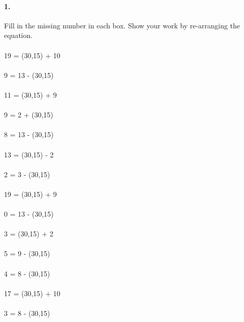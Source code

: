 \documentclass[12pt]{article}
\begin{document}
\paragraph{1.}
Fill in the missing number in each box. Show your work by re-arranging the equation. \\
\\
19 = \framebox(30,15){} + 10
\\
\\
9 = 13 - \framebox(30,15){}
\\
\\
11 = \framebox(30,15){} + 9
\\
\\
9 = 2 + \framebox(30,15){}
\\
\\
8 = 13 - \framebox(30,15){}
\\
\\
13 = \framebox(30,15){} - 2
\\
\\
2 = 3 - \framebox(30,15){}
\\
\\
19 = \framebox(30,15){} + 9
\\
\\
0 = 13 - \framebox(30,15){}
\\
\\
3 = \framebox(30,15){} + 2
\\
\\
5 = 9 - \framebox(30,15){}
\\
\\
4 = 8 - \framebox(30,15){}
\\
\\
17 = \framebox(30,15){} + 10
\\
\\
3 = 8 - \framebox(30,15){}
\end{document}
